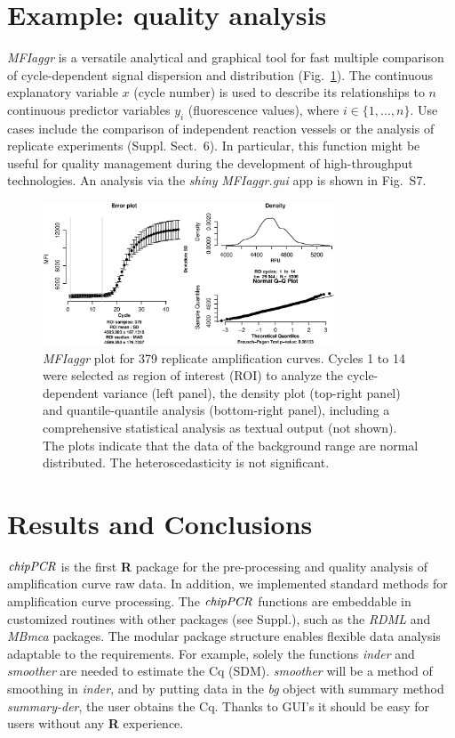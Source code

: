 \documentclass{bioinfo}
\begin{document}
\section{Example: quality analysis}

\textsl{MFIaggr} is a versatile analytical and graphical tool for fast multiple 
comparison of cycle-dependent signal dispersion and distribution 
(Fig.~\ref{fig:01}). The continuous explanatory variable $x$ (cycle number) is 
used to describe its relationships to $n$ continuous predictor variables $y_i$ 
(fluorescence values), where $i \in \{1, ..., n\}$. Use cases include the 
comparison of independent reaction vessels or the analysis of replicate 
experiments (Suppl. Sect.~6). In particular, this function might be useful for 
quality management during the development of high-throughput technologies. An 
analysis via the \emph{shiny} \textsl{MFIaggr.gui} app is shown in Fig.~S7.

\begin{figure}[!tpb]%
\centerline{\includegraphics[width=8.7cm]{fig01.eps}}
\caption{\textsl{MFIaggr} plot for 379 replicate amplification curves. Cycles 1 to 14 were 
selected as region of interest (ROI) to analyze the 
cycle-dependent variance (left panel), the density plot (top-right 
panel) and quantile-quantile analysis (bottom-right panel), including a 
comprehensive statistical analysis as textual output (not shown). The plots 
indicate that the data of the background range are normal 
distributed. The heteroscedasticity is not significant.}\label{fig:01}
\end{figure}
\section{Results and Conclusions}
$\emph{chipPCR}$ is the first \textbf{R} package for the pre-processing and 
quality analysis of amplification curve raw data. In addition, we implemented 
standard methods for amplification curve processing. The $\emph{chipPCR}$ 
functions are embeddable in customized routines with other packages (see 
Suppl.), such as the \emph{RDML} and \emph{MBmca} packages. The modular package 
structure enables flexible data analysis adaptable to the requirements. For 
example, solely the functions \textsl{inder} and \textsl{smoother} are needed 
to estimate the Cq (SDM). \textsl{smoother} will be a method of smoothing in 
\textsl{inder}, and by putting data in the \textsl{bg} object with summary 
method \textsl{summary-der}, the user obtains the Cq. Thanks to GUI's it should 
be easy for users without any \textbf{R} experience.
\end{document}
